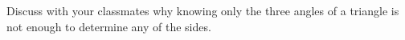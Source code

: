 { Discuss with your classmates why knowing only the three angles of a triangle is not enough to determine any of the sides.}
{}
